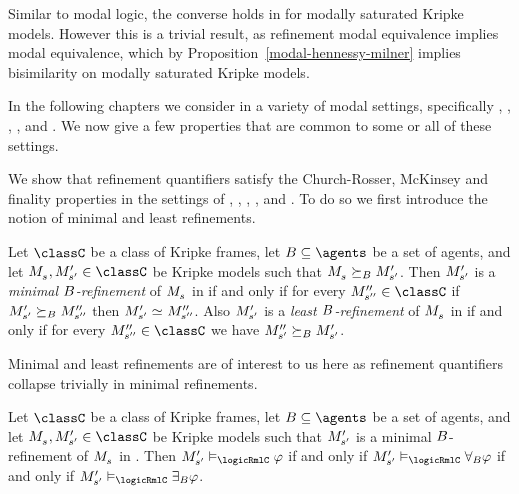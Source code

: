 Similar to modal logic, the converse holds in \logicRml{} for modally saturated Kripke models.
However this is a trivial result, as refinement modal equivalence implies modal equivalence, which by Proposition~\ref{modal-hennessy-milner} implies bisimilarity on modally saturated Kripke models.

In the following chapters we consider \logicRml{} in a variety of modal settings, specifically \classK{}, \classKF{}, \classKFF{}, \classKD{}, and \classS{}.
We now give a few properties that are common to some or all of these settings.

We show that refinement quantifiers satisfy the Church-Rosser, McKinsey and finality properties in the settings of \classK{}, \classKF{}, \classKFF{}, \classKD{}, and \classS{}.
To do so we first introduce the notion of minimal and least refinements.

\begin{definition}\label{minimal-refinement}
Let $\classC$ be a class of Kripke frames, let $\agentsB \subseteq \agents$ be a set of agents, and let $\kPModel{\kStateS}, \kPModelP{\kStateSP} \in \classC$ be Kripke models such that $\kPModel{\kStateS} \simulatesBs \kPModelP{\kStateSP}$.
Then ${M^{\prime}_{{s}^{\prime}}}$ is a {\em minimal $B$-refinement} of $\kPModel{\kStateS}$ in \classC{} if and only if for every $\kPModelPP{\kStateSPP} \in \classC$ if ${M^{\prime}_{{s}^{\prime}}} \succeq_{B} {M^{\prime\prime}_{{s}^{\prime\prime}}}$ then $\kPModelP{\kStateSP} \bisimilar \kPModelPP{\kStateSPP}$.
Also ${M^{\prime}_{{s}^{\prime}}}$ is a {\em least $B$-refinement} of $\kPModel{\kStateS}$ in \classC{} if and only if for every $\kPModelPP{\kStateSPP} \in \classC$ we have ${M^{\prime\prime}_{{s}^{\prime}}} \succeq_{B} {M^{\prime}_{{s}^{\prime}}}$.
\end{definition}

Minimal and least refinements are of interest to us here as refinement quantifiers collapse trivially in minimal refinements.

\begin{proposition}\label{minimal-refinement-collapse}
Let $\classC$ be a class of Kripke frames, let $\agentsB \subseteq \agents$ be a set of agents, and let $\kPModel{\kStateS}, \kPModelP{\kStateSP} \in \classC$ be Kripke models such that ${M^{\prime}_{{s}^{\prime}}}$ is a minimal $B$-refinement of $\kPModel{\kStateS}$ in \classC{}.
Then $\kPModelP{\kStateSP} \entails_\logicRmlC \phi$ if and only if $\kPModelP{\kStateSP} \entails_\logicRmlC \allrefsBs \phi$ if and only if $\kPModelP{\kStateSP} \entails_\logicRmlC \somerefsBs \phi$.
\end{proposition}

